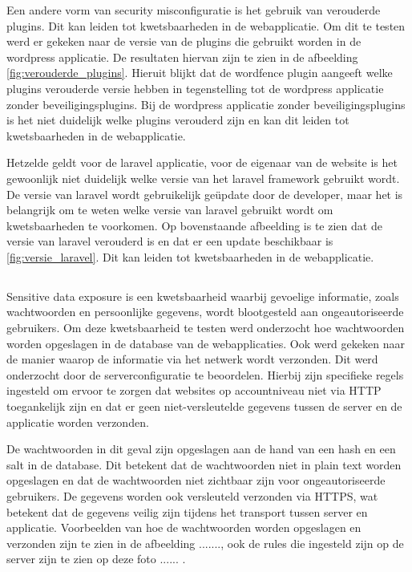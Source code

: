 Een andere vorm van security misconfiguratie is het gebruik van verouderde plugins. Dit kan leiden tot kwetsbaarheden in 
de webapplicatie. Om dit te testen werd er gekeken naar de versie van de plugins die gebruikt worden in de wordpress 
applicatie. De resultaten hiervan zijn te zien in de afbeelding \ref{fig:verouderde_plugins}. Hieruit blijkt dat de wordfence 
plugin aangeeft welke plugins verouderde versie hebben in tegenstelling tot de wordpress applicatie zonder beveiligingsplugins. 
Bij de wordpress applicatie zonder beveiligingsplugins is het niet duidelijk welke plugins verouderd zijn en kan dit leiden 
tot kwetsbaarheden in de webapplicatie.

Hetzelde geldt voor de laravel applicatie, voor de eigenaar van de website is het gewoonlijk niet duidelijk welke versie van 
het laravel framework gebruikt wordt. De versie van laravel wordt gebruikelijk geüpdate door de developer, maar het is 
belangrijk om te weten welke versie van laravel gebruikt wordt om kwetsbaarheden te voorkomen. Op bovenstaande afbeelding is 
te zien dat de versie van laravel verouderd is en dat er een update beschikbaar is \ref{fig:versie_laravel}. Dit kan leiden 
tot kwetsbaarheden in de webapplicatie. 


\subsection{}
Sensitive data exposure is een kwetsbaarheid waarbij gevoelige informatie, zoals wachtwoorden en persoonlijke gegevens, wordt 
blootgesteld aan ongeautoriseerde gebruikers. Om deze kwetsbaarheid te testen werd onderzocht hoe wachtwoorden worden 
opgeslagen in de database van de webapplicaties. Ook werd gekeken naar de manier waarop de informatie via het netwerk wordt 
verzonden. Dit werd onderzocht door de serverconfiguratie te beoordelen. Hierbij zijn specifieke regels ingesteld om ervoor 
te zorgen dat websites op accountniveau niet via HTTP toegankelijk zijn en dat er geen niet-versleutelde gegevens tussen de 
server en de applicatie worden verzonden.

De wachtwoorden in dit geval zijn opgeslagen aan de hand van een hash en een salt in de database. Dit betekent dat de 
wachtwoorden niet in plain text worden opgeslagen en dat de wachtwoorden niet zichtbaar zijn voor ongeautoriseerde gebruikers. 
De gegevens worden ook versleuteld verzonden via HTTPS, wat betekent dat de gegevens veilig zijn tijdens het transport tussen 
server en applicatie. Voorbeelden van hoe de wachtwoorden worden opgeslagen en verzonden zijn te zien in de afbeelding 
......., ook de rules die ingesteld zijn op de server zijn te zien op deze foto ...... .


